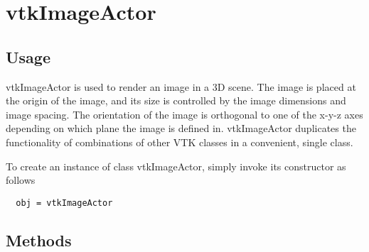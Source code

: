 \section{vtkImageActor}

\subsection{Usage}

 vtkImageActor is used to render an image in a 3D scene.  The image
 is placed at the origin of the image, and its size is controlled by the
 image dimensions and image spacing. The orientation of the image is
 orthogonal to one of the x-y-z axes depending on which plane the
 image is defined in. vtkImageActor duplicates the functionality 
 of combinations of other VTK classes in a convenient, single class.

To create an instance of class vtkImageActor, simply
invoke its constructor as follows
\begin{verbatim}
  obj = vtkImageActor
\end{verbatim}
\subsection{Methods}

